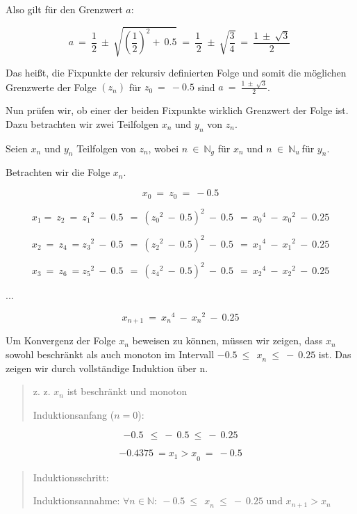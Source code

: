 \documentclass[a4paper, 12pt]{book}
\begin{document}
\begin{longtable}[]
\begin{minipage}[b]{\linewidth}
Also gilt für den Grenzwert \(a\):

\[a\  = \ \frac{1}{2}\  \pm \ \sqrt{\left( \frac{1}{2} \right)^{2} + \ 0.5}\  = \ \frac{1\ }{2}\  \pm \ \sqrt{\frac{3}{4}}\  = \ \frac{1\  \pm \ \sqrt{3}}{2}\ \]

Das heißt, die Fixpunkte der rekursiv definierten Folge und somit die
möglichen Grenzwerte der Folge \(\left( z_{n} \right)\) für
\(z_{0}\  = \  - 0.5\) sind \(a\  = \ \frac{1\  \pm \ \sqrt{3}}{2}\).

Nun prüfen wir, ob einer der beiden Fixpunkte wirklich Grenzwert der
Folge ist. Dazu betrachten wir zwei Teilfolgen \(x_{n}\) und \(y_{n}\)
von \(z_{n}\).

Seien \(x_{n}\) und \(y_{n}\) Teilfolgen von \(z_{n}\), wobei
\(n\  \in \ \mathbb{N}_{g}\) für \(x_{n}\) und
\(n\  \in \ \mathbb{N}_{u}\ \)für \(y_{n}\).

Betrachten wir die Folge \(x_{n}\).

\[x_{0}\  = \ z_{0}\  = \  - 0.5\]

\[x_{1}{= \ z}_{2}\  = \ {z_{1}}^{2}\  - \ 0.5\ \  = \ ({z_{0}}^{2}\  - \ 0.5)^{2}\  - \ 0.5\ \  = \ {x_{0}}^{4}\  - \ {x_{0}}^{2}\  - \ 0.25\]

\[x_{2}\  = \ z_{4}\  = {z_{3}}^{2}\  - \ 0.5\ \  = \ ({z_{2}}^{2}\  - \ 0.5)^{2}\  - \ 0.5\ \  = \ {x_{1}}^{4}\  - \ {x_{1}}^{2}\  - \ 0.25\]

\[x_{3}\  = \ z_{6}\  = {z_{5}}^{2}\  - \ 0.5\ \  = \ ({z_{4}}^{2}\  - \ 0.5)^{2}\  - \ 0.5\ \  = \ {x_{2}}^{4}\  - \ {x_{2}}^{2}\  - \ 0.25\]

...

\[x_{n + 1}\  = \ {x_{n}}^{4}\  - \ {x_{n}}^{2}\  - \ 0.25\]

Um Konvergenz der Folge \(x_{n}\) beweisen zu können, müssen wir zeigen,
dass \(x_{n}\) sowohl beschränkt als auch monoton im Intervall
\(- 0.5\ {\leq \ \ x}_{n}\  \leq \  - \ 0.25\) ist. Das zeigen wir durch
vollständige Induktion über n.

\begin{quote}
z. z. \(x_{n}\) ist beschränkt und monoton

Induktionsanfang (\(n = 0\)):
\end{quote}

\[- 0.5\ \  \leq \  - \ 0.5\  \leq \  - \ 0.25\]

\[{{- 0.4375\  = x}_{1} > x}_{0}\  = \  - 0.5\]

\begin{quote}
Induktionsschritt:

Induktionsannahme:
\(\forall n \in \mathbb{N:\ } - 0.5\ {\leq \ \ x}_{n}\  \leq \  - \ 0.25\)
und \(x_{n + 1} > x_{n}\)


\end{quote}
\end{minipage}
\end{longtable}
\end{document}
